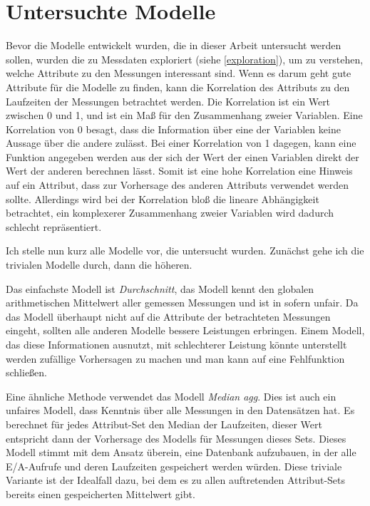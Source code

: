 \documentclass[
	12pt,
	a4paper,
	BCOR10mm,
	DIV14,
	listof=totoc,
	bibliography=totoc,
	headsepline
]{scrreprt}
\begin{document}
\section{Untersuchte Modelle}
\label{impl:modelle}
Bevor die Modelle entwickelt wurden, die in dieser Arbeit untersucht werden sollen, wurden die zu Messdaten exploriert (siehe \ref{exploration}), um zu verstehen, welche Attribute zu den Messungen interessant sind.
Wenn es darum geht gute Attribute für die Modelle zu finden, kann die Korrelation des Attributs zu den Laufzeiten der Messungen betrachtet werden. Die Korrelation ist ein Wert zwischen 0 und 1, und ist ein Maß für den Zusammenhang zweier Variablen. Eine Korrelation von 0 besagt, dass die Information über eine der Variablen keine Aussage über die andere zulässt. Bei einer Korrelation von 1 dagegen, kann eine Funktion angegeben werden aus der sich der Wert der einen Variablen direkt der Wert der anderen berechnen lässt. Somit ist eine hohe Korrelation eine Hinweis auf ein Attribut, dass zur Vorhersage des anderen Attributs verwendet werden sollte. Allerdings wird bei der Korrelation bloß die lineare Abhängigkeit betrachtet, ein komplexerer Zusammenhang zweier Variablen wird dadurch schlecht repräsentiert.

Ich stelle nun kurz alle Modelle vor, die untersucht wurden. Zunächst gehe ich die trivialen Modelle durch, dann die höheren.

Das einfachste Modell ist \textit{Durchschnitt}, das Modell kennt den globalen arithmetischen Mittelwert aller gemessen Messungen und ist in sofern unfair. Da das Modell überhaupt nicht auf die Attribute der betrachteten Messungen eingeht, sollten alle anderen Modelle bessere Leistungen erbringen. Einem Modell, das diese Informationen ausnutzt, mit schlechterer Leistung könnte unterstellt werden zufällige Vorhersagen zu machen und man kann auf eine Fehlfunktion schließen.

Eine ähnliche Methode verwendet das Modell \textit{Median agg}. Dies ist auch ein unfaires Modell, dass Kenntnis über alle Messungen in den Datensätzen hat. Es berechnet für jedes Attribut-Set den Median der Laufzeiten, dieser Wert entspricht dann der Vorhersage des Modells für Messungen dieses Sets. Dieses Modell stimmt mit dem Ansatz überein, eine Datenbank aufzubauen, in der alle E/A-Aufrufe und deren Laufzeiten gespeichert werden würden. Diese triviale Variante ist der Idealfall dazu, bei dem es zu allen auftretenden Attribut-Sets bereits einen gespeicherten Mittelwert gibt.
\end{document}
